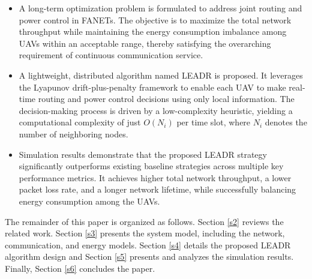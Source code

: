\documentclass[runningheads]{llncs}
\begin{document}
\begin{itemize}
    \item A long-term optimization problem is formulated to address joint routing and power control in FANETs. The objective is to maximize the total network throughput while maintaining the energy consumption imbalance among UAVs within an acceptable range, thereby satisfying the overarching requirement of continuous communication service.
    \item A lightweight, distributed algorithm named LEADR is proposed. It leverages the Lyapunov drift-plus-penalty framework to enable each UAV to make real-time routing and power control decisions using only local information. The decision-making process is driven by a low-complexity heuristic, yielding a computational complexity of just $O(N_i)$ per time slot, where $N_i$ denotes the number of neighboring nodes.
    \item Simulation results demonstrate that the proposed LEADR strategy significantly outperforms existing baseline strategies across multiple key performance metrics. It achieves higher total network throughput, a lower packet loss rate, and a longer network lifetime, while successfully balancing energy consumption among the UAVs.
\end{itemize}

The remainder of this paper is organized as follows.
Section \ref{s2} reviews the related work. 
Section \ref{s3} presents the system model, including the network, communication, and energy models. Section \ref{s4} details the proposed LEADR algorithm design and Section \ref{s5} presents and analyzes the simulation results. 
Finally, Section \ref{s6} concludes the paper.
\end{document}
